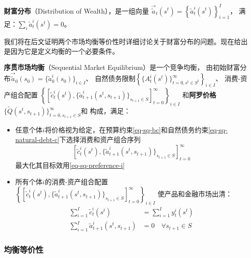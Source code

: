 \begin{definition}
    \textbf{财富分布}（Distribution of Wealth），是一组向量
        $\vec{\tilde{a}}_t\left(s^t\right)=\left\{\tilde{a}_t^i\left(s^t\right)\right\}_{i=1}^I$，
        满足：$\sum_{i}\tilde{a}_t^i\left(s^t\right)=0$。
\end{definition}

我们将在后文证明两个市场均衡等价性时详细讨论关于财富分布的问题。现在给出是因为它是定义均衡的一个必要条件。

\begin{definition}
    \textbf{序贯市场均衡}（Sequential Market Equilibrium）是一个竞争均衡，
    由初始财富分布$\vec{\tilde{a}}_0\left(s_0\right)=\{\tilde{a}_0^i\left(s_0\right)\}_{i\in I}$、
    自然债务限制$\left\{ \{ A_t^i\left(s^t\right) \}_{t=0,s^t\in S^t}^{\infty} \right\}_{i\in I}$、
    消费-资产组合配置
    $
    \left\{ \left[\tilde{c}_t^i\left(s^t\right), 
        \{\tilde{a}_{t+1}^i\left(s^t,s_{t+1}\right)\}_{s_{t+1}\in S} \right]_{t=0}^{\infty} \right\}_{i\in I}
    $
    和\textbf{阿罗价格}$\{\tilde{Q}\left(s^t,s_{t+1}\right)\}_{t=0, s_{t+1}\in S}^{\infty}$和
    构成，满足：
    \begin{itemize}
        \item 任意个体$i$将价格视为给定，在预算约束\ref{eq-sq-bc}和自然债务约束\ref{eq-sq-natural-debt-c}下选择消费和资产组合序列
            $$\left[\tilde{c}_t^i\left(s^t\right), \{\tilde{a}_{t+1}^i\left(s^t,s_{t+1}\right)\}_{s_{t+1}\in S} \right]_{t=0}^{\infty}$$
            最大化其目标效用\ref{eq-sq-preference-i}
        \item 所有个体$i$的消费-资产组合配置
            $
            \left\{ \left[\tilde{c}_t^i\left(s^t\right), 
                \{\tilde{a}_{t+1}^i\left(s^t,s_{t+1}\right)\}_{s_{t+1}\in S} \right]_{t=0}^{\infty} \right\}_{i\in I}
            $
            使产品和金融市场出清：
            \begin{align*}
                \sum_{i=1}^I \tilde{c}_t^i\left(s^t\right)&=\sum_{i=1}^I y_t^i\left(s^t\right) \\
                \sum_{i=1}^I \tilde{a}_{t+1}^i\left(s^t, s_{t+1}\right)&=0 \quad \forall s_{t+1} \in S
            \end{align*}
    \end{itemize}
\end{definition}


\subsubsection{均衡等价性}

